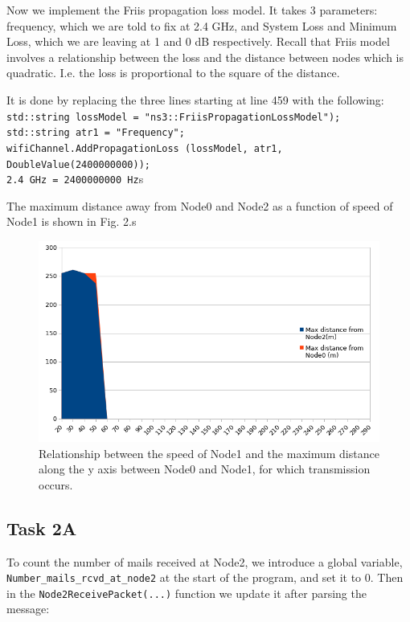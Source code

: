 \documentclass[11pt,journal]{article}
\begin{document}
	Now we implement the Friis propagation loss model. It takes 3 parameters: frequency, which we are told to fix at 2.4 GHz, and System Loss and Minimum Loss, which we are leaving at 1 and 0 dB respectively. Recall that Friis model involves a relationship between the loss and the distance between nodes which is quadratic. I.e. the loss is proportional to the square of the distance. 
	
	It is done by replacing the three lines starting at line 459 with the following:\\	
	\texttt{std::string lossModel = "ns3::FriisPropagationLossModel");}\\
	\texttt{std::string atr1 = "Frequency";}\\
	\texttt{wifiChannel.AddPropagationLoss (lossModel, atr1, DoubleValue(2400000000)); \\2.4 GHz = 2400000000 Hz}s
	
	The maximum distance away from Node0 and Node2 as a function of speed of Node1 is shown in Fig. 2.s
	
	\begin{figure}[h]
		\centering
		\includegraphics[scale=0.7]{graph1b.png}
		\caption{Relationship between the speed of Node1 and the maximum distance along the y axis between Node0 and Node1, for which transmission occurs.}
	\end{figure}
	
	\subsection{Task 2A}
	
	To count the number of mails received at Node2, we introduce a global variable, \texttt{Number\_mails\_rcvd\_at\_node2} at the start of the program, and set it to 0. Then in the \texttt{Node2ReceivePacket(...)} function we update it after parsing the message:
	
\end{document}
